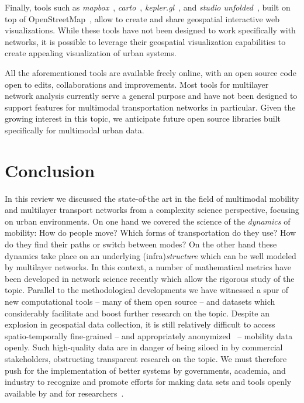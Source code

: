 Finally, tools such as \textit{mapbox}~\cite{mapbox}, \textit{carto}~\cite{carto}, \textit{kepler.gl}~\cite{kepler2021kepler}, and \textit{studio unfolded}~\cite{unfolded}, built on top of OpenStreetMap~\cite{OpenStreetMap}, allow to create and share geospatial interactive web visualizations. While these tools have not been designed to work specifically with networks, it is possible to leverage their geospatial visualization capabilities to create appealing visualization of urban systems.

All the aforementioned tools are available freely online, with an open source code open to edits, collaborations and improvements. Most tools for multilayer network analysis currently serve a general purpose and have not been designed to support features for multimodal transportation networks in particular. Given the growing interest in this topic, we anticipate future open source libraries built specifically for multimodal urban data.

\section{Conclusion \label{sec:conclusions}}

In this review we discussed the state-of-the art in the field of multimodal mobility and multilayer transport networks from a complexity science perspective, focusing on urban environments. On one hand we covered the science of the \emph{dynamics} of mobility: How do people move? Which forms of transportation do they use? How do they find their paths or switch between modes? On the other hand these dynamics take place on an underlying (infra)\emph{structure} which can be well modeled by multilayer networks. In this context, a number of mathematical metrics have been developed in network science recently which allow the rigorous study of the topic. Parallel to the methodological developments we have witnessed a spur of new computational tools -- many of them open source -- and datasets which considerably facilitate and boost further research on the topic. Despite an explosion in geospatial data collection, it is still relatively difficult to access spatio-temporally fine-grained -- and appropriately anonymized~\cite{de2013unique} -- mobility data openly. Such high-quality data are in danger of being siloed in by commercial stakeholders, obstructing transparent research on the topic. We must therefore push for the implementation of better systems by governments, academia, and industry to recognize and promote efforts for making data sets and tools openly available by and for researchers~\cite{stodden2016enhancing,lovelace2021open}. 

